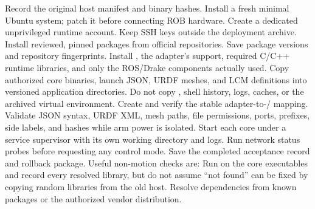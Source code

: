 {}\markdownRendererSectionBegin
{}\markdownRendererInterblockSeparator
{}\markdownRendererOlBegin
{}Record the original host manifest and binary hashes.\markdownRendererOlItemEnd 
{}Install a fresh minimal Ubuntu system; patch it before connecting ROB hardware.\markdownRendererOlItemEnd 
{}Create a dedicated unprivileged runtime account. Keep SSH keys outside the deployment archive.\markdownRendererOlItemEnd 
{}Install reviewed, pinned packages from official repositories. Save package versions and repository fingerprints.\markdownRendererOlItemEnd 
{}Install , the adapter's  support, required C/C++ runtime libraries, and only the ROS/Drake components actually used.\markdownRendererOlItemEnd 
{}Copy authorized core binaries, launch JSON, URDF meshes, and LCM definitions into versioned application directories. Do not copy , shell history, logs, caches, or the archived virtual environment.\markdownRendererOlItemEnd 
{}Create and verify the stable adapter-to-/ mapping.\markdownRendererOlItemEnd 
{}Validate JSON syntax, URDF XML, mesh paths, file permissions, ports, prefixes, side labels, and hashes while arm power is isolated.\markdownRendererOlItemEnd 
{}Start each core under a service supervisor with its own working directory and logs.\markdownRendererOlItemEnd 
{}Run network status probes before requesting any control mode.\markdownRendererOlItemEnd 
{}Save the completed acceptance record and rollback package.\markdownRendererOlItemEnd 
\markdownRendererOlEnd \markdownRendererInterblockSeparator
{}Useful non-motion checks are:\markdownRendererInterblockSeparator
{}\markdownRendererInterblockSeparator
{}Run  on the core executables and record every resolved library, but do not assume “not found” can be fixed by copying random libraries from the old host. Resolve dependencies from known packages or the authorized vendor distribution.\markdownRendererInterblockSeparator
